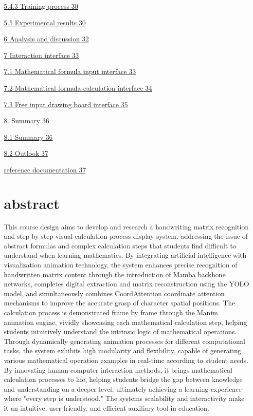 \documentclass[
]{article}
\begin{document}
\hyperref[training-process]{5.4.3 Training process 30}

\hyperref[experimental-result]{5.5 Experimental results 30}

\hyperref[analysis-and-discussion]{6 Analysis and discussion 32}

\hyperref[interface-for-interaction]{7 Interaction interface 33}

\hyperref[mathematical-formula-input-interface]{7.1 Mathematical formula
input interface 33}

\hyperref[mathematical-formula-calculation-interface]{7.2 Mathematical
formula calculation interface 34}

\hyperref[free-input-board-interface]{7.3 Free input drawing board
interface 35}

\hyperref[sum-up]{8. Summary 36}

\hyperref[sum-up-1]{8.1 Summary 36}

\hyperref[look-into-the-distance]{8.2 Outlook 37}

\hyperref[reference-documentation]{reference documentation 37}

\section{}\label{section}

\section{abstract}\label{abstract}

This course design aims to develop and research a handwriting matrix
recognition and step-by-step visual calculation process display system,
addressing the issue of abstract formulas and complex calculation steps
that students find difficult to understand when learning mathematics. By
integrating artificial intelligence with visualization animation
technology, the system enhances precise recognition of handwritten
matrix content through the introduction of Mamba backbone networks,
completes digital extraction and matrix reconstruction using the YOLO
model, and simultaneously combines CoordAttention coordinate attention
mechanisms to improve the accurate grasp of character spatial positions.
The calculation process is demonstrated frame by frame through the Manim
animation engine, vividly showcasing each mathematical calculation step,
helping students intuitively understand the intrinsic logic of
mathematical operations. Through dynamically generating animation
processes for different computational tasks, the system exhibits high
modularity and flexibility, capable of generating various mathematical
operation examples in real-time according to student needs. By
innovating human-computer interaction methods, it brings mathematical
calculation processes to life, helping students bridge the gap between
knowledge and understanding on a deeper level, ultimately achieving a
learning experience where "every step is understood." The
system\textquotesingle s scalability and interactivity make it an
intuitive, user-friendly, and efficient auxiliary tool in education.
\end{document}
